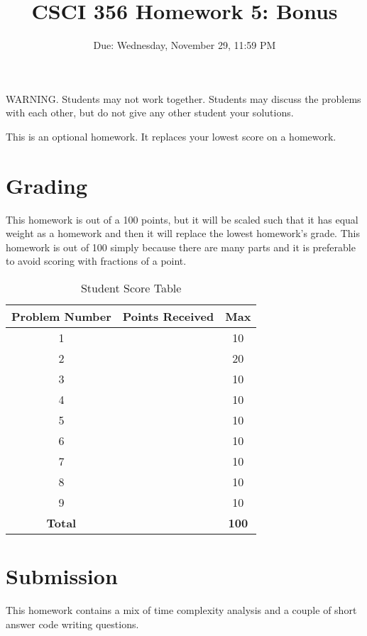 \documentclass{article}
\title{CSCI 356 Homework 5: Bonus}
\date{Due: Wednesday, November 29, 11:59 PM}
\begin{document}
\maketitle %




WARNING.  Students may not work together.  Students may discuss the
problems with each other, but do not give any other student your solutions.

This is an optional homework.  It replaces your lowest score
on a homework.

\section{Grading}

This homework is out of a 100 points, but it will be scaled such that it has
equal weight as a homework and then it will replace the lowest homework's
grade.  This homework is out of 100 simply because there are many parts
and it is preferable to avoid scoring with fractions of a point.


\begin{table}[h]
    \centering
    \begin{tabular}{ccc}
    \toprule
    Problem Number & Points Received & Max \\
    \midrule
    1 &  & 10 \\
    2 &  & 20 \\
    3 &  & 10 \\
    4 &  & 10 \\
    5 &  & 10 \\
    6 &  & 10 \\
    7 &  & 10 \\
    8 &  & 10 \\
    9 &  & 10 \\
    \midrule
    \textbf{Total} &  & \textbf{100} \\
    \bottomrule
    \end{tabular}
    \caption{Student Score Table}
    \label{tab:my_label}
\end{table}

\section{Submission}

This homework contains a mix of time complexity analysis and a couple
of short answer code writing questions.
\end{document}
